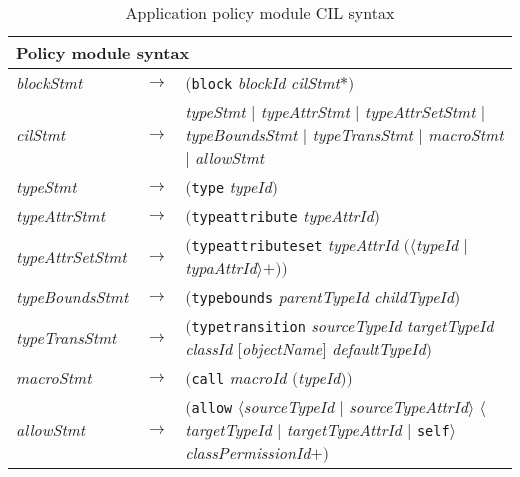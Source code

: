 \begin{table*}[h!]
	\centering
        \small
	\begin{tabularx}{\textwidth}{|p{5.8em}p{0.15em}X|}
	\hline
	\multicolumn{3}{|l|}{\textbf{Policy module syntax}} \\ \hline
	\textit{blockStmt} & $\to$& $($\texttt{block} \textit{blockId} \textit{cilStmt}$*$$)$ \\

	\textit{cilStmt} & $\to$&  \textit{ typeStmt} $|$
                                  \textit{typeAttrStmt} $|$
                                  \textit{typeAttrSetStmt} $|$
                                  \textit{typeBoundsStmt} $|$
                                  \textit{typeTransStmt} $|$
                                  \textit{macroStmt} $|$
                                  \textit{allowStmt} \\

	\textit{typeStmt} & $\to$ & $($\texttt{type} \textit{typeId}$)$ \\

	\textit{typeAttrStmt} & $\to$& $($\texttt{typeattribute} \textit{typeAttrId}$)$ \\

	\textit{typeAttrSetStmt} & $\to$ & $($\texttt{typeattributeset} \textit{typeAttrId} $($$\langle$\textit{typeId} $|$ \textit{typaAttrId$\rangle$}$+$$)$$)$ \\

	\textit{typeBoundsStmt} & $\to$& $($\texttt{typebounds} \textit{parentTypeId} \textit{childTypeId}$)$ \\

	\textit{typeTransStmt} & $\to$ &  $($\texttt{typetransition} \textit{sourceTypeId} \textit{targetTypeId} \textit{classId} $[$\textit{objectName}$]$ \textit{defaultTypeId}$)$ \\

	\textit{macroStmt} &$\to$ &$($\texttt{call} \textit{macroId} $($\textit{typeId}$)$$)$ \\

	\textit{allowStmt} & $\to$& $($\texttt{allow} $\langle$\textit{sourceTypeId} $|$ \textit{sourceTypeAttrId}$\rangle$  $\langle$\textit{targetTypeId} $|$ \textit{targetTypeAttrId} $|$ \texttt{self}$\rangle$  \textit{classPermissionId}$+$$)$ \\ \hline

      \end{tabularx}
        \caption{Application policy module CIL syntax}      
  \label{tab:seapp_syntax}
\end{table*}


